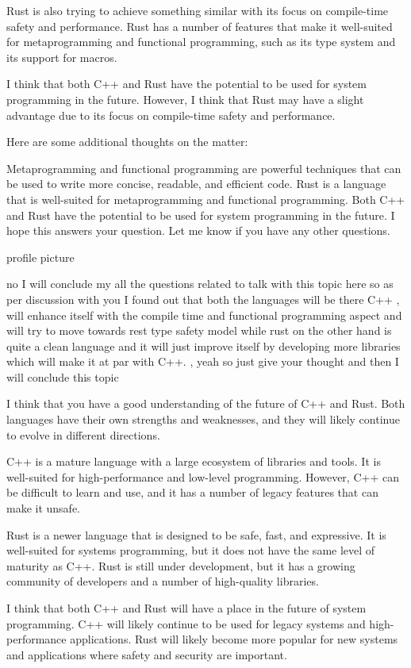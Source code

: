 \documentclass[11pt]{article}
\begin{document}
Rust is also trying to achieve something similar with its focus on compile-time safety and performance. Rust has a number of features that make it well-suited for metaprogramming and functional programming, such as its type system and its support for macros.

I think that both C++ and Rust have the potential to be used for system programming in the future. However, I think that Rust may have a slight advantage due to its focus on compile-time safety and performance.

Here are some additional thoughts on the matter:

Metaprogramming and functional programming are powerful techniques that can be used to write more concise, readable, and efficient code.
Rust is a language that is well-suited for metaprogramming and functional programming.
Both C++ and Rust have the potential to be used for system programming in the future.
I hope this answers your question. Let me know if you have any other questions.

profile picture

no I will conclude my all the questions related to talk with this topic here
so as per discussion with you I found out that
both the languages will be there
C++
, will enhance itself
with the compile time and
functional programming aspect
and will try to move towards rest
type safety
model
while rust on the other hand
is quite a clean language and
it will just improve itself
by
developing more libraries
which will make it at par with
C++.
, yeah
so just give your thought and then I will conclude this topic

I think that you have a good understanding of the future of C++ and Rust. Both languages have their own strengths and weaknesses, and they will likely continue to evolve in different directions.

C++ is a mature language with a large ecosystem of libraries and tools. It is well-suited for high-performance and low-level programming. However, C++ can be difficult to learn and use, and it has a number of legacy features that can make it unsafe.

Rust is a newer language that is designed to be safe, fast, and expressive. It is well-suited for systems programming, but it does not have the same level of maturity as C++. Rust is still under development, but it has a growing community of developers and a number of high-quality libraries.

I think that both C++ and Rust will have a place in the future of system programming. C++ will likely continue to be used for legacy systems and high-performance applications. Rust will likely become more popular for new systems and applications where safety and security are important.
\end{document}
